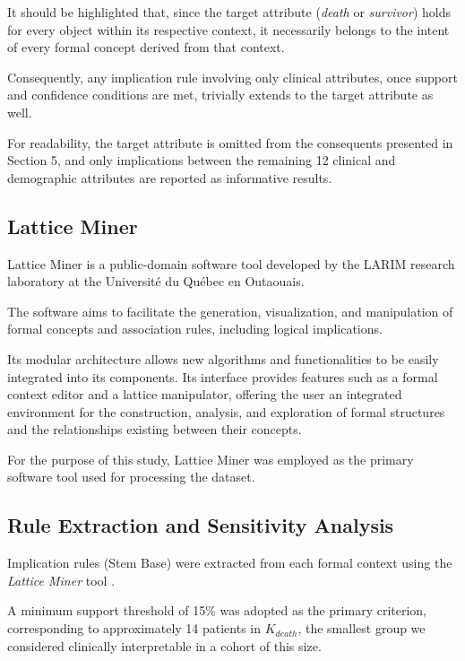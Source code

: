 \documentclass[a4paper,twoside]{article}
\begin{document}
It should be highlighted that, since the target attribute (\textit{death} or \textit{survivor}) holds for every object within its respective context, it necessarily belongs to the intent of every formal concept derived from that context.

Consequently, any implication rule involving only clinical attributes, once support and confidence conditions are met, trivially extends to the target attribute as well.

For readability, the target attribute is omitted from the consequents presented in Section 5, and only implications between the remaining 12 clinical and demographic attributes are reported as informative results.



\subsection{Lattice Miner}

Lattice Miner is a public-domain software tool developed by the LARIM research laboratory at the Université du Québec en Outaouais. 

The software aims to facilitate the generation, visualization, and manipulation of formal concepts and association rules, including logical implications. 

Its modular architecture allows new algorithms and functionalities to be easily integrated into its components. 
Its interface provides features such as a formal context editor and a lattice manipulator, offering the user an integrated environment for the construction, analysis, and exploration of formal structures and the relationships existing between their concepts.


For the purpose of this study, Lattice Miner was employed as the primary software tool used for processing the dataset. 

\subsection{Rule Extraction and Sensitivity Analysis}

Implication rules (Stem Base) were extracted from each formal context using the \textit{Lattice Miner} tool \cite{Missaoui2017}.

A minimum support threshold of 15\% was adopted as the primary criterion, corresponding to approximately 14 patients in $K_{death}$, the smallest group we considered clinically interpretable in a cohort of this size.
\end{document}
